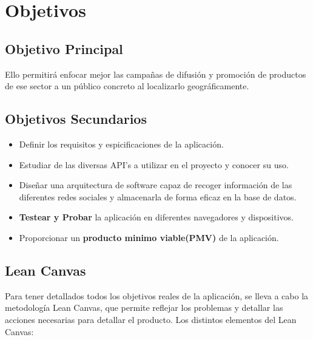 \chapter{Objetivos}


\section{Objetivo Principal}


Ello permitirá enfocar mejor las campañas de difusión y promoción de productos de ese sector a un público concreto al localizarlo geográficamente.

\vspace{5 mm}

\section{Objetivos Secundarios}

\begin{itemize}
  \item Definir los requisitos y espicificaciones de la aplicación.
  \item Estudiar de las diversas API's a utilizar en el proyecto y conocer su uso.
  \item Diseñar una arquitectura de software capaz de recoger información de las diferentes redes sociales y almacenarla de forma eficaz en la base de datos.
  \item \textbf{Testear y Probar} la aplicación en diferentes navegadores y dispositivos.
  \item Proporcionar un \textbf{producto minimo viable(PMV)} de la aplicación.
\end{itemize}

\section{Lean Canvas}

Para tener detallados todos los objetivos reales de la aplicación, se lleva a cabo la metodología Lean Canvas, que permite reflejar los problemas y detallar las acciones necesarias para detallar el producto. Los distintos elementos del Lean Canvas:

